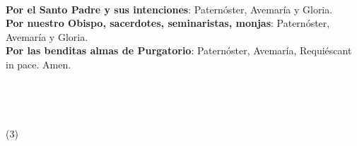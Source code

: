 \documentclass[9pt]{article}
\begin{document}
\begin{multicols*}{2}
    \vspace{2mm}

    \\

    \textbf{Por el Santo Padre y sus intenciones}: Paternóster, Avemaría y Gloria.\\[1mm]
    \textbf{Por nuestro Obispo, sacerdotes, seminaristas, monjas}: Paternóster, Avemaría y Gloria.\\[1mm]
    \textbf{Por las benditas almas de Purgatorio}: Paternóster, Avemaría, Requiéscant in pace. Amen.\\

    \\
    \\
    \\
    \\
    (3)\\[1mm]
    \\[1mm]
    


    \\
    \\
    \\
    

\end{multicols*}
\end{document}
